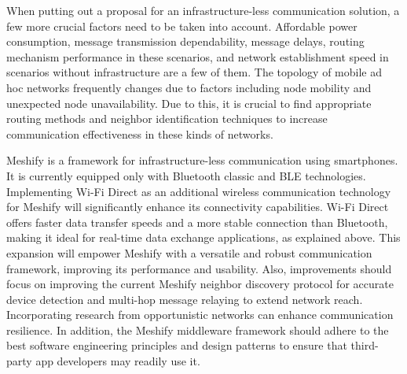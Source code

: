 When putting out a proposal for an infrastructure-less communication solution,
a few more crucial factors need to be taken into account. Affordable power
consumption, message transmission dependability, message delays, routing
mechanism performance in these scenarios, and network establishment speed in
scenarios without infrastructure are a few of them. The topology of mobile ad
hoc networks frequently changes due to factors including node mobility and
unexpected node unavailability.
Due to this, it is crucial to find appropriate routing methods and neighbor
identification techniques to increase communication effectiveness in these
kinds of networks.

Meshify is a framework for infrastructure-less communication using smartphones.
It is currently equipped only with Bluetooth classic and BLE
technologies\cite{gunasekara2022}. Implementing Wi-Fi Direct as an additional
wireless communication technology for Meshify will significantly enhance its
connectivity capabilities. Wi-Fi Direct offers faster data transfer speeds and
a more stable connection than Bluetooth, making it ideal for real-time data
exchange applications, as explained above. This expansion will empower Meshify
with a versatile and robust communication framework, improving its performance
and usability. Also, improvements should focus on improving the current Meshify
neighbor discovery protocol for accurate device detection and multi-hop message
relaying to extend network reach. Incorporating research from opportunistic
networks can enhance communication resilience. In addition, the Meshify
middleware framework should adhere to the best software engineering principles
and design patterns to ensure that third-party app developers may readily use
it.
